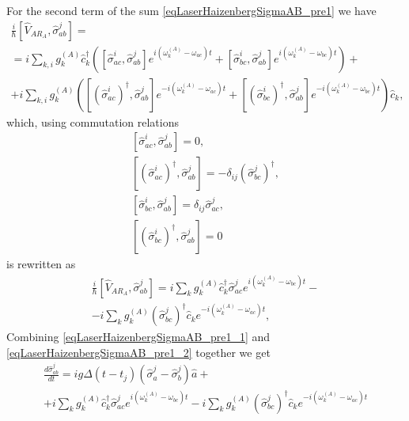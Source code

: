 For the second term of the sum \eqref{eqLaserHaizenbergSigmaAB_pre1} we have
\begin{eqnarray}
\frac{i}{\hbar}
\left[\hat{V}_{AR_A}, \hat{\sigma}_{ab}^j\right] = 
\nonumber \\
=
i
\sum_{k,i}
g_k^{(A)}
\hat{c}_k^{\dag}
 \left(
\left[\hat{\sigma}^{i}_{ac},\hat{\sigma}_{ab}^j\right]  
e^{i\left(\omega_k^{(A)} - \omega_{ac}\right)t}
+ 
\left[\hat{\sigma}^{i}_{bc},\hat{\sigma}_{ab}^j\right]  
e^{i\left(\omega_k^{(A)} - \omega_{bc}\right)t}
\right)
+
\nonumber \\
+
 i
\sum_{k,i}
g_k^{(A)}
 \left(
\left[\left(\hat{\sigma}^{i}_{ac}\right)^{\dag},\hat{\sigma}_{ab}^j\right]  
e^{-i\left(\omega_k^{(A)} - \omega_{ac}\right)t}
+ 
\left[\left(\hat{\sigma}^{i}_{bc}\right)^{\dag},\hat{\sigma}_{ab}^j\right]  
e^{-i\left(\omega_k^{(A)} - \omega_{bc}\right)t}
\right)\hat{c}_k,
\nonumber
\end{eqnarray}
which, using commutation relations
\begin{eqnarray}
\left[\hat{\sigma}^{i}_{ac},\hat{\sigma}_{ab}^j\right] = 0, 
\nonumber \\
\left[\left(\hat{\sigma}^{i}_{ac}\right)^{\dag},\hat{\sigma}_{ab}^j\right] = 
- \delta_{ij}\left(\hat{\sigma}^{j}_{bc}\right)^{\dag},
\nonumber \\
\left[\hat{\sigma}^{i}_{bc},\hat{\sigma}_{ab}^j\right] = \delta_{ij}\hat{\sigma}^{j}_{ac},
\nonumber \\
\left[\left(\hat{\sigma}^{i}_{bc}\right)^{\dag},\hat{\sigma}_{ab}^j\right] = 0
\label{eqLaserHaizenbergTaskKommutator2}
\end{eqnarray}
is rewritten as
\begin{eqnarray}
\frac{i}{\hbar}
\left[\hat{V}_{AR_A}, \hat{\sigma}_{ab}^j\right] = 
i
\sum_{k}
g_k^{(A)}
\hat{c}_k^{\dag}
\hat{\sigma}^{j}_{ac}  
e^{i\left(\omega_k^{(A)} - \omega_{bc}\right)t} -
\nonumber \\
-
 i
\sum_{k}
g_k^{(A)}
\left(\hat{\sigma}^{j}_{bc}\right)^{\dag}\hat{c}_k
e^{-i\left(\omega_k^{(A)} - \omega_{ac}\right)t},
\label{eqLaserHaizenbergSigmaAB_pre1_2}
\end{eqnarray}
Combining \eqref{eqLaserHaizenbergSigmaAB_pre1_1} and 
\eqref{eqLaserHaizenbergSigmaAB_pre1_2} together we get 
\begin{eqnarray}
\frac{d \hat{\sigma}_{ab}^j}{d t} = 
i g 
\Delta\left(t - t_j\right) 
\left(\hat{\sigma}^{j}_{a} -
\hat{\sigma}^{j}_{b}\right)\hat{a} +
\nonumber \\
+ i \sum_{k}
g_k^{(A)}
\hat{c}_k^{\dag}
\hat{\sigma}^{j}_{ac}  
e^{i\left(\omega_k^{(A)} - \omega_{bc}\right)t}
-
 i
\sum_{k}
g_k^{(A)}
\left(\hat{\sigma}^{j}_{bc}\right)^{\dag}\hat{c}_k
e^{-i\left(\omega_k^{(A)} - \omega_{ac}\right)t}
\label{eqLaserHaizenbergSigmaAB_pre2}
\end{eqnarray}
